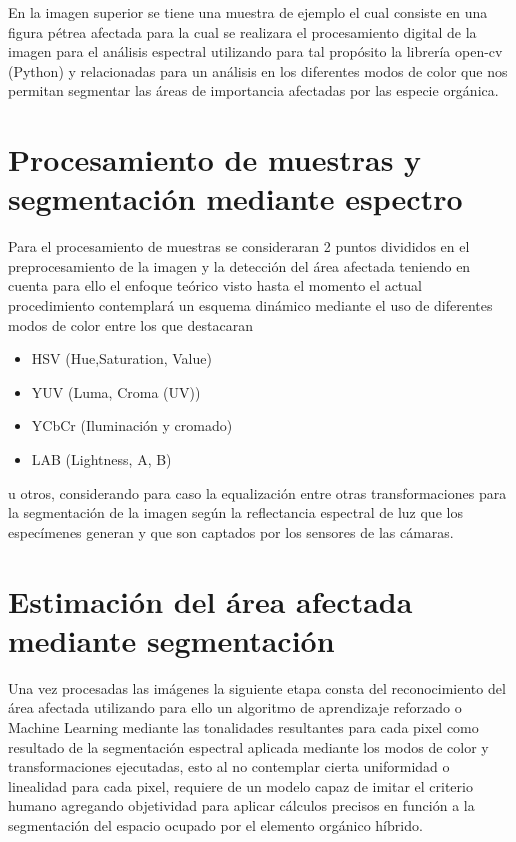 En la imagen superior se tiene una muestra de ejemplo el cual consiste en una figura pétrea afectada para la cual se realizara el procesamiento  digital de la imagen para el análisis espectral utilizando para tal propósito la librería open-cv (Python) y relacionadas para un análisis en los diferentes modos de color que nos permitan segmentar las áreas de importancia afectadas por las especie orgánica.

\section{Procesamiento de muestras y segmentación mediante espectro}
Para el procesamiento de muestras se consideraran 2 puntos divididos en el preprocesamiento de la imagen y la detección del área afectada teniendo en cuenta para ello el enfoque teórico visto hasta el momento el actual procedimiento contemplará un esquema dinámico mediante el uso de diferentes modos de color entre los que destacaran

\begin{itemize}
	\item HSV (Hue,Saturation, Value)
	\item YUV (Luma, Croma (UV))
	\item YCbCr (Iluminación y cromado)
	\item LAB (Lightness, A, B)
\end{itemize}

u otros, considerando para caso la equalización entre otras transformaciones para la segmentación de la imagen según la reflectancia espectral de luz que los especímenes generan y que son captados por los sensores de las cámaras.

\section{Estimación del área afectada mediante segmentación}

Una vez procesadas las imágenes la siguiente etapa consta del reconocimiento del área afectada utilizando para ello un algoritmo de aprendizaje reforzado o Machine Learning mediante las tonalidades resultantes para cada pixel como resultado de la segmentación espectral aplicada mediante los modos de color y transformaciones ejecutadas, esto al no contemplar cierta uniformidad o linealidad para cada pixel, requiere de un modelo capaz de imitar el criterio humano agregando objetividad para aplicar cálculos precisos en función a la segmentación del espacio ocupado por el elemento orgánico híbrido.

